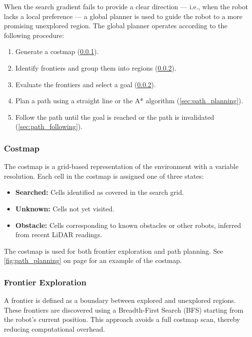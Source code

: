 When the search gradient fails to provide a clear direction --- i.e., when the robot lacks a local preference --- a global planner is used to guide the robot to a more promising unexplored region. The global planner operates according to the following procedure:

\begin{enumerate}
  \item Generate a costmap (\cref{sec:costmap}).
  \item Identify frontiers and group them into regions (\cref{sec:frontier_exploration}).
  \item Evaluate the frontiers and select a goal (\cref{sec:frontier_exploration}).
  \item Plan a path using a straight line or the A* algorithm (\cref{sec:path_planning}).
  \item Follow the path until the goal is reached or the path is invalidated (\cref{sec:path_following}).
\end{enumerate}

\subsubsection{Costmap}
\label{sec:costmap}
The costmap is a grid-based representation of the environment with a variable resolution. Each cell in the costmap is assigned one of three states:

\begin{itemize}
  \item \textbf{Searched:} Cells identified as covered in the search grid.
  \item \textbf{Unknown:} Cells not yet visited.
  \item \textbf{Obstacle:} Cells corresponding to known obstacles or other robots, inferred from recent LiDAR readings.
\end{itemize}

The costmap is used for both frontier exploration and path planning. See \cref{fig:path_planning} on page \pageref{fig:path_planning} for an example of the costmap.

\subsubsection{Frontier Exploration}
\label{sec:frontier_exploration}
A frontier is defined as a boundary between explored and unexplored regions. These frontiers are discovered using a Breadth-First Search (BFS) starting from the robot's current position. This approach avoids a full costmap scan, thereby reducing computational overhead. \\


